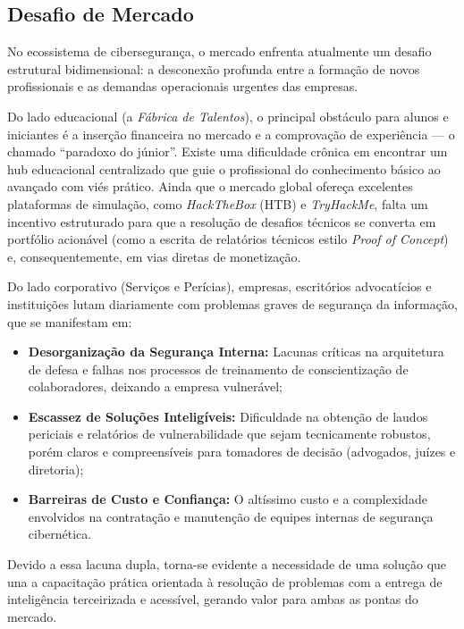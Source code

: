 \documentclass[../main.tex]{subfiles}
\begin{document}
\subsection{Desafio de Mercado}

No ecossistema de cibersegurança, o mercado enfrenta atualmente um desafio estrutural bidimensional: a desconexão profunda entre a formação de novos profissionais e as demandas operacionais urgentes das empresas.

Do lado educacional (a \textit{Fábrica de Talentos}), o principal obstáculo para alunos e iniciantes é a inserção financeira no mercado e a comprovação de experiência — o chamado ``paradoxo do júnior''. Existe uma dificuldade crônica em encontrar um hub educacional centralizado que guie o profissional do conhecimento básico ao avançado com viés prático. Ainda que o mercado global ofereça excelentes plataformas de simulação, como \textit{HackTheBox} (HTB) e \textit{TryHackMe}, falta um incentivo estruturado para que a resolução de desafios técnicos se converta em portfólio acionável (como a escrita de relatórios técnicos estilo \textit{Proof of Concept}) e, consequentemente, em vias diretas de monetização.

Do lado corporativo (Serviços e Perícias), empresas, escritórios advocatícios e instituições lutam diariamente com problemas graves de segurança da informação, que se manifestam em:

\begin{itemize}
  \item \textbf{Desorganização da Segurança Interna:} Lacunas críticas na arquitetura de defesa e falhas nos processos de treinamento de conscientização de colaboradores, deixando a empresa vulnerável;
  \item \textbf{Escassez de Soluções Inteligíveis:} Dificuldade na obtenção de laudos periciais e relatórios de vulnerabilidade que sejam tecnicamente robustos, porém claros e compreensíveis para tomadores de decisão (advogados, juízes e diretoria);
  \item \textbf{Barreiras de Custo e Confiança:} O altíssimo custo e a complexidade envolvidos na contratação e manutenção de equipes internas de segurança cibernética.
\end{itemize}

Devido a essa lacuna dupla, torna-se evidente a necessidade de uma solução que una a capacitação prática orientada à resolução de problemas com a entrega de inteligência terceirizada e acessível, gerando valor para ambas as pontas do mercado.
\end{document}
